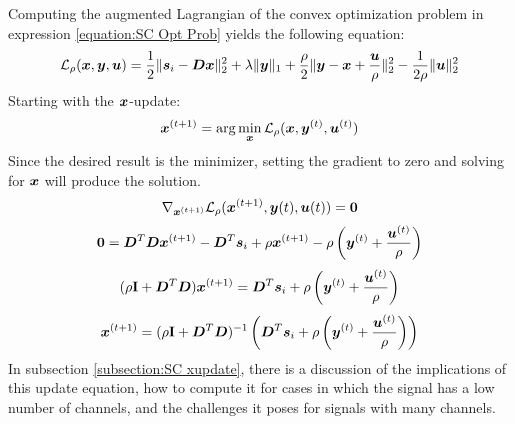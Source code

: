 Computing the augmented Lagrangian of the convex optimization problem in expression \ref{equation:SC Opt Prob} yields the following equation:
%
\begin{equation}
\mathcal{L}_{\rho}(\bm{x},\bm{y},\bm{u}) = \frac{1}{2} \|\bm{s}_i - \bm{D}\bm{x}\|_2^2 + \lambda\|\bm{y}\|_1 + \frac{\rho}{2}\|\bm{y} - \bm{x} + \frac{\bm{u}}{\rho}\|_2^2 - \frac{1}{2\rho}\|\bm{u}\|_2^2
\end{equation}
%
Starting with the $\bm{x}$-update:
\begin{equation}
\bm{x}^{(t + 1)} = \arg\min_{\bm{x}} \mathcal{L}_{\rho}(\bm{x},\bm{y}^{(t)},\bm{u}^{(t)})
\end{equation}
%
Since the desired result is the minimizer, setting the gradient to zero and solving for $\bm{x}$ will produce the solution.
%
\begin{equation}
\nabla_{\bm{x}^{(t + 1)}} \mathcal{L}_{\rho}(\bm{x}^{(t + 1)},\bm{y}{(t)},\bm{u}{(t)}) = \bm{0}
\end{equation}
%
\begin{equation}
\bm{0} = \bm{D}^T\bm{D}\bm{x}^{(t + 1)} - \bm{D}^T\bm{s}_i + \rho\bm{x}^{(t + 1)} - \rho\left(\bm{y}^{(t)} + \frac{\bm{u}^{(t)}}{\rho}\right)
\end{equation}
%
\begin{equation}
(\rho{\bf I} + \bm{D}^T\bm{D})\bm{x}^{(t + 1)} = \bm{D}^T\bm{s}_i + \rho\left(\bm{y}^{(t)} + \frac{\bm{u}^{(t)}}{\rho}\right)
\end{equation}
%
\begin{equation}
\bm{x}^{(t + 1)} = (\rho{\bf I} + \bm{D}^T\bm{D})^{-1}\left(\bm{D}^T\bm{s}_i + \rho\left(\bm{y}^{(t)} + \frac{\bm{u}^{(t)}}{\rho}\right)\right)
\end{equation}
%
In subsection \ref{subsection:SC xupdate}, there is a discussion of the implications of this update equation, how to compute it for cases in which the signal has a low number of channels, and the challenges it poses for signals with many channels.

